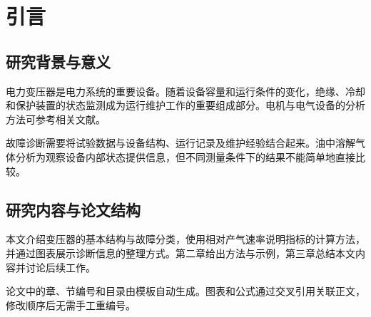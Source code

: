 \chapter{引言}

\section{研究背景与意义}
电力变压器是电力系统的重要设备。随着设备容量和运行条件的变化，绝缘、冷却和保护装置的状态监测成为运行维护工作的重要组成部分。电机与电气设备的分析方法可参考相关文献\cite{gao1987}。

故障诊断需要将试验数据与设备结构、运行记录及维护经验结合起来。油中溶解气体分析为观察设备内部状态提供信息，但不同测量条件下的结果不能简单地直接比较。

\section{研究内容与论文结构}
本文介绍变压器的基本结构与故障分类，使用相对产气速率说明指标的计算方法，并通过图表展示诊断信息的整理方式。第二章给出方法与示例，第三章总结本文内容并讨论后续工作。

论文中的章、节编号和目录由模板自动生成。图表和公式通过交叉引用关联正文，修改顺序后无需手工重编号。
